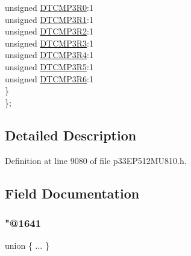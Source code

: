 \begin{DoxyCompactItemize}
\begin{tabbing}
\>\>unsigned \hyperlink{structtag_r_p_i_n_r39_b_i_t_s_a8fdeee118abb064677443556bbe2501e}{DTCMP3R0}:1\\
\>\>unsigned \hyperlink{structtag_r_p_i_n_r39_b_i_t_s_af3131b7cecd937887c8279b57cfbb21e}{DTCMP3R1}:1\\
\>\>unsigned \hyperlink{structtag_r_p_i_n_r39_b_i_t_s_ade95b639334e1721aa73bcf1cf8b2397}{DTCMP3R2}:1\\
\>\>unsigned \hyperlink{structtag_r_p_i_n_r39_b_i_t_s_af8b42e52a08cbc3ab079a04b930b11ca}{DTCMP3R3}:1\\
\>\>unsigned \hyperlink{structtag_r_p_i_n_r39_b_i_t_s_af9ad429b96907dd0cbb29fca00f19e8b}{DTCMP3R4}:1\\
\>\>unsigned \hyperlink{structtag_r_p_i_n_r39_b_i_t_s_a5889b4962bc3865a1c2fb26388a4dd35}{DTCMP3R5}:1\\
\>\>unsigned \hyperlink{structtag_r_p_i_n_r39_b_i_t_s_a2a91bbada52f189d28b014c167d33bae}{DTCMP3R6}:1\\
\>\} \\
\}; \\

\end{tabbing}\end{DoxyCompactItemize}


\subsection{Detailed Description}


Definition at line 9080 of file p33\+E\+P512\+M\+U810.\+h.



\subsection{Field Documentation}
\mbox{\label{structtag_r_p_i_n_r39_b_i_t_s_a4b18af687061f24716b2d935e56f9cd2}} 
\subsubsection{\texorpdfstring{"@1641}{@1641}}
{\footnotesize\ttfamily union \{ ... \} }

\mbox{\label{structtag_r_p_i_n_r39_b_i_t_s_adf71f3d8410c1f1dbbc96680a92c49af}} 
